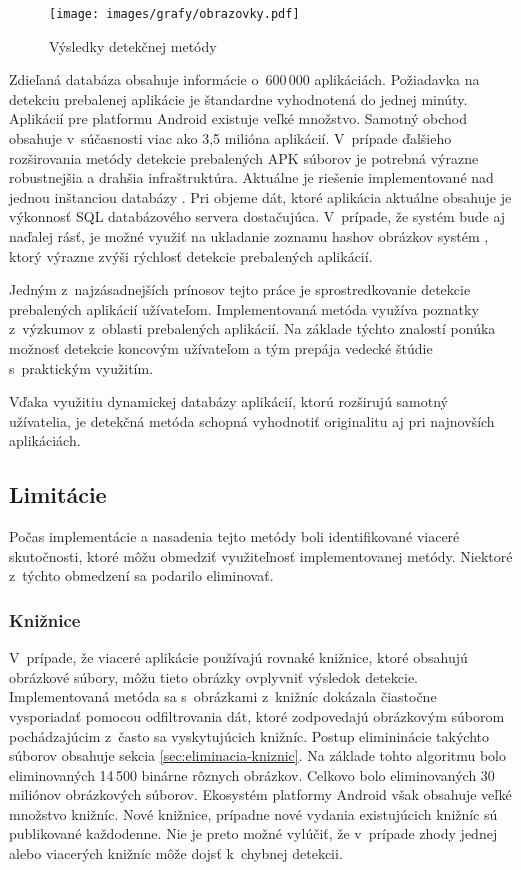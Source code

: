 \begin{figure}[htb]
  \begin{center}
    \texttt{[image: images/grafy/obrazovky.pdf]}
  \end{center}
  \caption{Výsledky detekčnej metódy}
  \label{fig:detectionOriginal}
\end{figure}

Zdieľaná databáza obsahuje informácie o~600\,000 aplikáciách. Požiadavka na detekciu prebalenej aplikácie je štandardne vyhodnotená do jednej minúty. Aplikácií pre platformu Android existuje veľké množstvo. Samotný obchod  obsahuje v~súčasnosti viac ako 3,5 milióna aplikácií. V~prípade ďalšieho rozširovania metódy detekcie prebalených APK súborov  je potrebná výrazne robustnejšia a drahšia infraštruktúra. Aktuálne je riešenie implementované nad jednou inštanciou databázy . Pri objeme dát, ktoré aplikácia aktuálne obsahuje je výkonnosť SQL databázového servera dostačujúca. V~prípade, že systém bude aj naďalej rásť, je možné využiť na ukladanie zoznamu hashov obrázkov systém , ktorý výrazne zvýši rýchlosť detekcie prebalených aplikácií. 

Jedným z~najzásadnejších prínosov tejto práce je sprostredkovanie detekcie prebalených aplikácií užívateľom. Implementovaná metóda využíva poznatky z~výzkumov z~oblasti prebalených aplikácií. Na základe týchto znalostí ponúka možnosť detekcie koncovým užívateľom a tým prepája vedecké štúdie s~praktickým využitím. 

Vďaka využitiu dynamickej databázy aplikácií, ktorú rozširujú samotný užívatelia, je detekčná metóda schopná vyhodnotiť originalitu aj pri najnovších aplikáciách.

\subsection{Limitácie}
Počas implementácie a nasadenia tejto metódy boli identifikované viaceré skutočnosti, ktoré môžu obmedziť využiteľnosť implementovanej metódy. Niektoré z~týchto obmedzení sa podarilo eliminovať.

\subsubsection{\textbf{Knižnice}}
V~prípade, že viaceré aplikácie používajú rovnaké knižnice, ktoré obsahujú obrázkové súbory, môžu tieto obrázky ovplyvniť výsledok detekcie. Implementovaná metóda sa s~obrázkami z~knižníc dokázala čiastočne vysporiadať pomocou odfiltrovania dát, ktoré zodpovedajú obrázkovým súborom pochádzajúcim z~často sa vyskytujúcich knižníc. Postup elimininácie takýchto súborov obsahuje sekcia \ref{sec:eliminacia-kniznic}. Na základe tohto algoritmu bolo eliminovaných 14\,500 binárne rôznych obrázkov. Celkovo bolo eliminovaných 30 miliónov obrázkových súborov. Ekosystém platformy Android však obsahuje veľké množstvo knižníc. Nové knižnice, prípadne nové vydania existujúcich knižníc sú publikované každodenne. Nie je preto možné vylúčiť, že v~prípade zhody jednej alebo viacerých knižníc môže dojsť k~chybnej detekcii.

